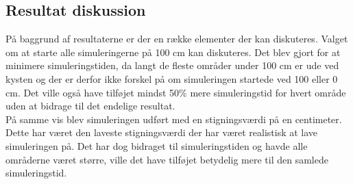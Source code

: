 


\subsection{Resultat diskussion} \label{Resultat Diskussion}
På baggrund af resultaterne er der en række elementer der kan diskuteres. Valget om at starte alle simuleringerne på 100 cm kan diskuteres. Det blev gjort for at minimere simuleringstiden, da langt de fleste områder under 100 cm er ude ved kysten og der er derfor ikke forskel på om simuleringen startede ved 100 eller 0 cm. Det ville også have tilføjet mindst 50\% mere simuleringstid for hvert område uden at bidrage til det endelige resultat. \\ 
På samme vis blev simuleringen udført med en stigningsværdi på en centimeter. Dette har været den laveste stigningsværdi der har været realistisk at lave simuleringen på. Det har dog bidraget til simuleringstiden og havde alle områderne været større, ville det have tilføjet betydelig mere til den samlede simuleringstid. \\ 

